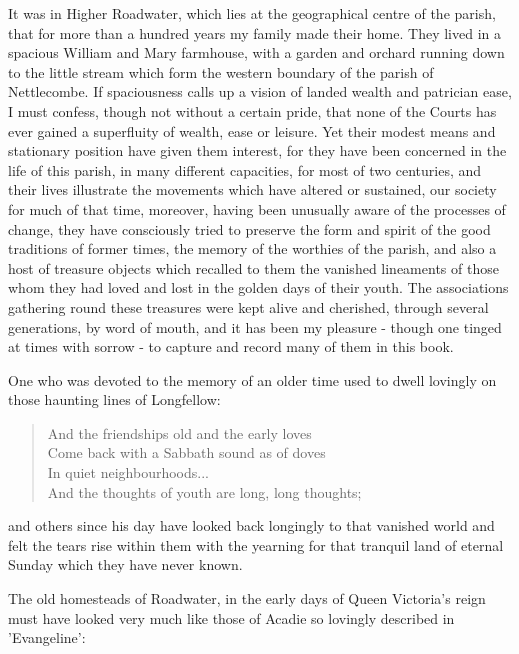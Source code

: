 
It was in Higher Roadwater, which lies at the geographical centre of the parish, that for more than a hundred years my family made their home. They lived in a spacious William and Mary farmhouse, with a garden and orchard running down to the little stream which form the western boundary of the parish of Nettlecombe. If spaciousness calls up a vision of landed wealth and patrician ease, I must confess, though not without a certain pride, that none of the Courts has ever gained a superfluity of wealth, ease or leisure. Yet their modest means and stationary position have given them interest, for they have been concerned in the life of this parish, in many different capacities, for most of two centuries, and their lives illustrate the movements which have altered or sustained, our society for much of that time, moreover, having been unusually aware of the processes of change, they have consciously tried to preserve the form and spirit of the good traditions of former times, the memory of the worthies of the parish, and also a host of treasure objects which recalled to them the vanished lineaments of those whom they had loved and lost in the golden days of their youth. The associations gathering round these treasures were kept alive and cherished, through several generations, by word of mouth, and it has been my pleasure - though one tinged at times with sorrow - to capture and record many of them in this book.

One who was devoted to the memory of an older time used to dwell lovingly on those haunting lines of Longfellow:

\begin{quote}
And the friendships old and the early loves \\
Come back with a Sabbath sound as of doves \\
In quiet neighbourhoods... \\
And the thoughts of youth are long, long thoughts;
\end{quote}

and others since his day have looked back longingly to that vanished world and felt the tears rise within them with the yearning for that tranquil land of eternal Sunday which they have never known.

\Flourish 

The old homesteads of Roadwater, in the early days of Queen Victoria’s reign must have looked very much like those of Acadie so lovingly described in ’Evangeline’:

